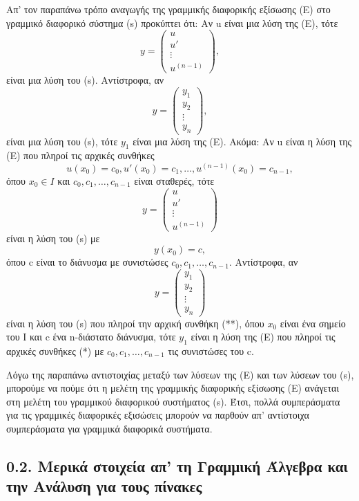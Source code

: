 \documentclass[11pt,a4paper,twoside]{book}
\begin{document}
Απ' τον παραπάνω τρόπο αναγωγής της γραμμικής διαφορικής εξίσωσης (Ε) στο γραμμικό διαφορικό σύστημα (s) προκύπτει ότι: Αν u είναι μια λύση της (Ε), τότε
\[
y = \begin{pmatrix} u \\ u' \\ \vdots \\ u^{(n-1)} \end{pmatrix},
\]
είναι μια λύση του (s). Αντίστροφα, αν
\[
y = \begin{pmatrix} y_1 \\ y_2 \\ \vdots \\ y_n \end{pmatrix},
\]
είναι μια λύση του (s), τότε $y_1$ είναι μια λύση της (Ε). Ακόμα: Αν u είναι η λύση της (Ε) που πληροί τις αρχικές συνθήκες
\begin{equation} \tag{*}
u(x_0)=c_0, u'(x_0)=c_1, \dots, u^{(n-1)}(x_0)=c_{n-1},
\end{equation}
όπου $x_0 \in I$ και $c_0, c_1, \dots, c_{n-1}$ είναι σταθερές, τότε
\[
y = \begin{pmatrix} u \\ u' \\ \vdots \\ u^{(n-1)} \end{pmatrix}
\]
είναι η λύση του (s) με
\begin{equation} \tag{**}
y(x_0)=c,
\end{equation}
όπου c είναι το διάνυσμα με συνιστώσες $c_0, c_1, \dots, c_{n-1}$. Αντίστροφα, αν
\[
y = \begin{pmatrix} y_1 \\ y_2 \\ \vdots \\ y_n \end{pmatrix}
\]
είναι η λύση του (s) που πληροί την αρχική συνθήκη (**), όπου $x_0$ είναι ένα σημείο του Ι και c ένα n-διάστατο διάνυσμα, τότε $y_1$ είναι η λύση της (Ε) που πληροί τις αρχικές συνθήκες (*) με $c_0, c_1, \dots, c_{n-1}$ τις συνιστώσες του c.

Λόγω της παραπάνω αντιστοιχίας μεταξύ των λύσεων της (Ε) και των λύσεων του (s), μπορούμε να πούμε ότι η μελέτη της γραμμικής διαφορικής εξίσωσης (Ε) ανάγεται στη μελέτη του γραμμικού διαφορικού συστήματος (s). Έτσι, πολλά συμπεράσματα για τις γραμμικές διαφορικές εξισώσεις μπορούν να παρθούν απ' αντίστοιχα συμπεράσματα για γραμμικά διαφορικά συστήματα.

\subsection*{0.2. Μερικά στοιχεία απ' τη Γραμμική Άλγεβρα και την Ανάλυση για τους πίνακες}
\end{document}
